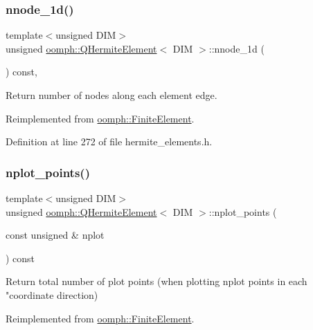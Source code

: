 \subsubsection{\texorpdfstring{nnode\+\_\+1d()}{nnode\_1d()}}
{\footnotesize\ttfamily template$<$unsigned D\+IM$>$ \\
unsigned \hyperlink{classoomph_1_1QHermiteElement}{oomph\+::\+Q\+Hermite\+Element}$<$ D\+IM $>$\+::nnode\+\_\+1d (\begin{DoxyParamCaption}{ }\end{DoxyParamCaption}) const\hspace{0.3cm}{\ttfamily [inline]}, {\ttfamily [virtual]}}



Return number of nodes along each element edge. 



Reimplemented from \hyperlink{classoomph_1_1FiniteElement_ab65c7a94dda80c1876a09ac12be4e39c}{oomph\+::\+Finite\+Element}.



Definition at line 272 of file hermite\+\_\+elements.\+h.

\mbox{\label{classoomph_1_1QHermiteElement_a4afca94e16e9a63c4e2a0fa4ee2853db}} 
\subsubsection{\texorpdfstring{nplot\+\_\+points()}{nplot\_points()}\hspace{0.1cm}{\footnotesize\ttfamily [1/3]}}
{\footnotesize\ttfamily template$<$unsigned D\+IM$>$ \\
unsigned \hyperlink{classoomph_1_1QHermiteElement}{oomph\+::\+Q\+Hermite\+Element}$<$ D\+IM $>$\+::nplot\+\_\+points (\begin{DoxyParamCaption}\item[{const unsigned \&}]{nplot }\end{DoxyParamCaption}) const\hspace{0.3cm}{\ttfamily [virtual]}}

Return total number of plot points (when plotting nplot points in each "coordinate direction) 

Reimplemented from \hyperlink{classoomph_1_1FiniteElement_a8ed563c7ff0cfd8bafdbb0132b388106}{oomph\+::\+Finite\+Element}.

